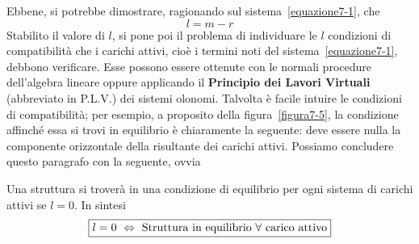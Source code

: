 \noindent Ebbene, si potrebbe dimostrare, ragionando sul sistema~\eqref{equazione7-1}, che 
\begin{equation*}
\boxed{l = m-r}
\end{equation*}
Stabilito il valore di $l$, si pone poi il problema di individuare le $l$ condizioni di compatibilità che i carichi attivi, cioè i termini noti del sistema~\eqref{equazione7-1}, debbono verificare. Esse possono essere ottenute con le normali procedure dell'algebra lineare oppure applicando il \textbf{Principio dei Lavori Virtuali} (abbreviato in P.L.V.) dei sistemi olonomi. Talvolta è facile intuire le condizioni di compatibilità; per esempio, a proposito della figura~\ref{figura7-5}, la condizione affinché essa si trovi in equilibrio è chiaramente la seguente: deve essere nulla la componente orizzontale della risultante dei carichi attivi. Possiamo concludere questo paragrafo con la seguente, ovvia 
\begin{prop}
Una struttura si troverà in una condizione di equilibrio per ogni sistema di carichi attivi se $l=0$. In sintesi
\begin{equation*}
\boxed{l=0\,\,\Leftrightarrow\,\, \textup{Struttura in equilibrio }\forall\textup{ carico attivo}}
\end{equation*}
\end{prop}

